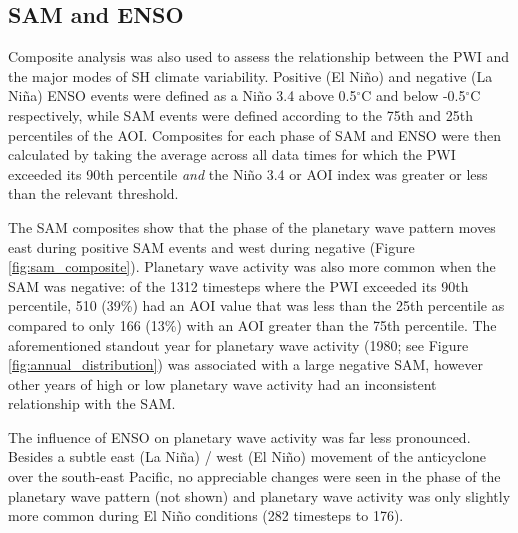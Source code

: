 \subsection{SAM and ENSO}

Composite analysis was also used to assess the relationship between the PWI and the major modes of SH climate variability. Positive (El Ni\~{n}o) and negative (La Ni\~{n}a) ENSO events were defined as a Ni\~{n}o 3.4 above 0.5$^{\circ}$C and below -0.5$^{\circ}$C respectively, while SAM events were defined according to the 75th and 25th percentiles of the AOI. Composites for each phase of SAM and ENSO were then calculated by taking the average across all data times for which the PWI exceeded its 90th percentile \textit{and} the Ni\~{n}o 3.4 or AOI index was greater or less than the relevant threshold. 

The SAM composites show that the phase of the planetary wave pattern moves east during positive SAM events and west during negative (Figure \ref{fig:sam_composite}). Planetary wave activity was also more common when the SAM was negative: of the 1312 timesteps where the PWI exceeded its 90th percentile, 510 (39\%) had an AOI value that was less than the 25th percentile as compared to only 166 (13\%) with an AOI greater than the 75th percentile. The aforementioned standout year for planetary wave activity (1980; see Figure \ref{fig:annual_distribution}) was associated with a large negative SAM, however other years of high or low planetary wave activity had an inconsistent relationship with the SAM.

The influence of ENSO on planetary wave activity was far less pronounced. Besides a subtle east (La Ni\~{n}a) / west (El Ni\~{n}o) movement of the anticyclone over the south-east Pacific, no appreciable changes were seen in the phase of the planetary wave pattern (not shown) and planetary wave activity was only slightly more common during El Ni\~{n}o conditions (282 timesteps to 176).      